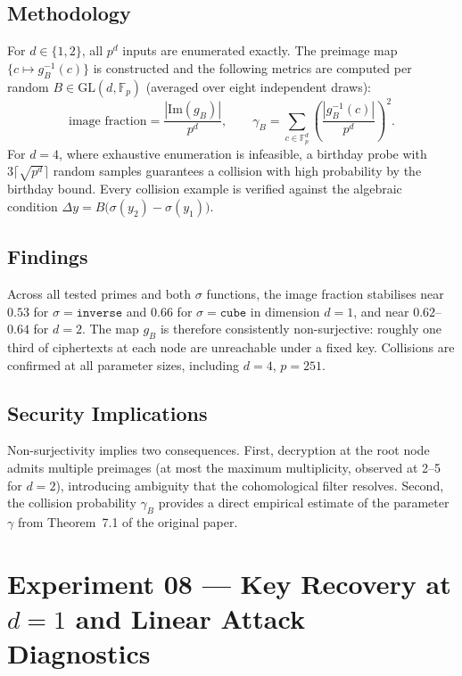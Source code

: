 \documentclass[12pt,a4paper]{article}
\theoremstyle{definition}
\newcommand{\Fp}{\mathbb{F}_p}
\newcommand{\GL}{\mathrm{GL}}
\newcommand{\Img}{\mathrm{Im}}
\begin{document}
\subsection{Methodology}

For $d \in \{1, 2\}$, all $p^d$ inputs are enumerated exactly.
The preimage map $\{c \mapsto g_B^{-1}(c)\}$ is constructed and the
following metrics are computed per random $B \in \GL(d, \Fp)$
(averaged over eight independent draws):
\begin{equation}
  \text{image fraction} = \frac{|\Img(g_B)|}{p^d}, \qquad
  \gamma_B = \sum_{c \in \Fp^d} \!\left(\frac{|g_B^{-1}(c)|}{p^d}\right)^{\!2}.
\end{equation}
For $d = 4$, where exhaustive enumeration is infeasible, a birthday
probe with $3\lceil\sqrt{p^d}\rceil$ random samples guarantees a
collision with high probability by the birthday bound. Every collision
example is verified against the algebraic condition
$\Delta y = B\bigl(\sigma(y_2) - \sigma(y_1)\bigr)$.

\subsection{Findings}

Across all tested primes and both $\sigma$ functions, the image
fraction stabilises near $0.53$ for $\sigma = \texttt{inverse}$
and $0.66$ for $\sigma = \texttt{cube}$ in dimension $d = 1$, and
near $0.62$--$0.64$ for $d = 2$. The map $g_B$ is therefore
consistently non-surjective: roughly one third of ciphertexts at
each node are unreachable under a fixed key. Collisions are confirmed
at all parameter sizes, including $d = 4$, $p = 251$.

\subsection{Security Implications}

Non-surjectivity implies two consequences. First, decryption at the
root node admits multiple preimages (at most the maximum multiplicity,
observed at 2--5 for $d = 2$), introducing ambiguity that the
cohomological filter resolves. Second, the collision probability
$\gamma_B$ provides a direct empirical estimate of the parameter
$\gamma$ from Theorem~7.1 of the original paper.

\section{Experiment 08 --- Key Recovery at $d=1$ and Linear Attack Diagnostics}
\end{document}
